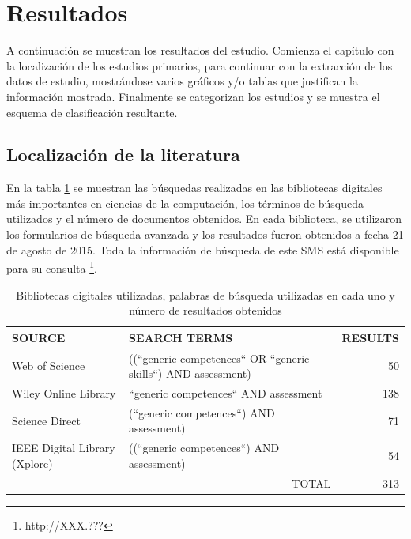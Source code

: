 \section{Resultados}

A continuación se muestran los resultados del estudio. Comienza el capítulo con la localización de los estudios primarios, para continuar con la extracción de los datos de estudio, mostrándose varios gráficos y/o tablas que justifican la información mostrada. Finalmente se categorizan los estudios y se muestra el esquema de clasificación resultante.

\subsection{Localización de la literatura}

En la tabla \ref{tab:ResumenBusquedaResultados} se muestran las búsquedas realizadas en las bibliotecas digitales más importantes en ciencias de la computación, los términos de búsqueda utilizados y el número de documentos obtenidos. En cada biblioteca, se utilizaron los formularios de búsqueda avanzada y los resultados fueron obtenidos a fecha 21 de agosto de 2015. Toda la información de búsqueda de este SMS está disponible para su consulta \footnote{http://XXX.???}.


\begin{table}
  \begin{center}
  \begin{tabular}{| p{4cm} | p{8cm} | r |}
    \hline
    SOURCE & SEARCH TERMS & RESULTS\\
    \hline
    \hline
    Web of Science & ((``generic competences`` OR ``generic skills``) AND assessment) & 50 \\
    \hline
    Wiley Online Library & ``generic competences`` AND assessment &  138 \\
    \hline
    Science Direct & (``generic competences``) AND assessment) &  71 \\
    \hline
    IEEE Digital Library (Xplore) & ((``generic competences``) AND assessment) & 54 \\
    \hline
    \hline
    \multicolumn{2}{|r|}{TOTAL} & 313\\
    \hline
  \end{tabular}
\end{center}
\caption{Bibliotecas digitales utilizadas, palabras de búsqueda utilizadas en cada uno y número de resultados obtenidos}
\label{tab:ResumenBusquedaResultados}
\end{table} 


